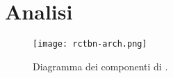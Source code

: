 \section{Analisi}

\begin{figure}
	\centering
	\texttt{[image: rctbn-arch.png]}
	\caption[Diagramma dei componenti di \rctbn{}]{Diagramma dei componenti di \rctbn{}.}
	\label{fig:rctbncomponents}
\end{figure}












